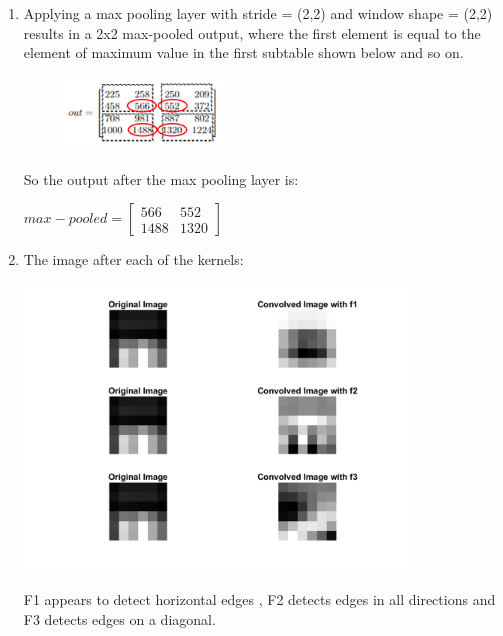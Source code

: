 \documentclass{article}
\begin{document}
\begin{enumerate} [label=\Alph*]
    
    \item  Applying a max pooling layer with stride = (2,2) and window shape = (2,2) results in a 2x2 max-pooled output, where the first element is equal to the element of maximum value in the first subtable shown below and so on. 
        \begin{figure}[h]
          \centering
          \includegraphics[width=0.4\textwidth]{prob11_b.png} \\      
        \end{figure}
        \newline So the output after the max pooling layer is:
        \begin{center}
        $ max-pooled = \begin{bmatrix}
            566 & 552 \\
            1488 & 1320
        \end{bmatrix}$ 
        \end{center}
    
    \item The image after each of the kernels: \\
        \begin{center}
            \includegraphics[width=0.8\textwidth]{problem11images.png}
        \end{center}
        F1 appears to detect horizontal edges , F2 detects edges in all directions and F3 detects edges on a diagonal.
        
            
\end{enumerate}\
\end{document}
